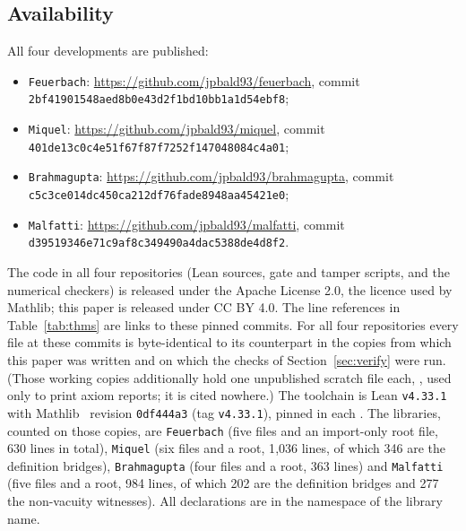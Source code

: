 \documentclass[11pt]{article}
\theoremstyle{definition}
\theoremstyle{remark}
\newcommand{\lean}[1]{\texttt{#1}}
\newcommand{\commitfeuerbach}{\texttt{2bf41901548aed8b0e43d2f1bd10bb1a1d54ebf8}}
\newcommand{\commitbrahmagupta}{\texttt{c5c3ce014dc450ca212df76fade8948aa45421e0}}
\newcommand{\commitmiquel}{\texttt{401de13c0c4e51f67f87f7252f147048084c4a01}}
\newcommand{\commitmalfatti}{\texttt{d39519346e71c9af8c349490a4dac5388de4d8f2}}
\begin{document}
\subsection{Availability}\label{sec:avail}
All four developments are published:
\begin{itemize}
\item \lean{Feuerbach}: \url{https://github.com/jpbald93/feuerbach}, commit \commitfeuerbach;
\item \lean{Miquel}: \url{https://github.com/jpbald93/miquel}, commit \commitmiquel;
\item \lean{Brahmagupta}: \url{https://github.com/jpbald93/brahmagupta}, commit \commitbrahmagupta;
\item \lean{Malfatti}: \url{https://github.com/jpbald93/malfatti}, commit \commitmalfatti.
\end{itemize}
The code in all four repositories (Lean sources, gate and tamper scripts, and the numerical
checkers) is released under the Apache License 2.0, the licence used by Mathlib; this paper is
released under CC BY 4.0.
The line references in Table~\ref{tab:thms} are links to these pinned commits. For
all four repositories every  file at these commits is byte-identical to its counterpart
in the copies from which this paper was written and on which the checks of
Section~\ref{sec:verify} were run. (Those working copies additionally hold one unpublished
scratch file each, , used only to print axiom reports; it is cited nowhere.) The toolchain is Lean \texttt{v4.33.1}~\cite{Lean4} with Mathlib~\cite{Mathlib}
revision \texttt{0df444a3} (tag \texttt{v4.33.1}), pinned in each . The
libraries, counted on those copies, are \lean{Feuerbach} (five files and an import-only root file,
630 lines in total), \lean{Miquel} (six files and a root, 1{,}036 lines, of which 346 are the
definition bridges), \lean{Brahmagupta} (four files and a root, 363 lines) and \lean{Malfatti}
(five files and a root, 984 lines, of which 202 are the definition bridges and 277 the
non-vacuity witnesses). All declarations are in the namespace of the library name.
\end{document}
